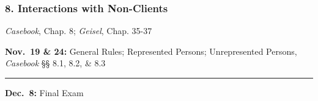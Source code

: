 \documentclass[11pt,letterpaper,twoside]{article}
\begin{document}
\subsubsection{8. Interactions with
Non-Clients}\label{interactions-with-non-clients}

\emph{Casebook}, Chap. 8; \emph{Geisel}, Chap. 35-37

\textbf{Nov.~19 \& 24:} General Rules; Represented Persons;
Unrepresented Persons, \emph{Casebook} §§ 8.1, 8.2, \& 8.3

\begin{center}\rule{0.5\linewidth}{0.5pt}\end{center}

\textbf{Dec.~8:} Final Exam
\end{document}
